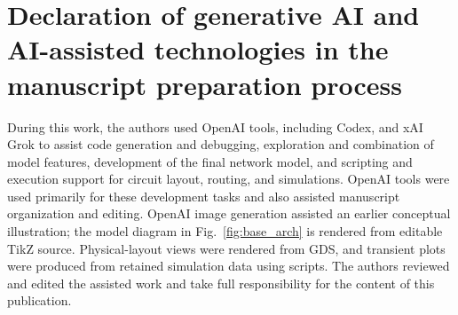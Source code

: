 \documentclass[preprint,12pt,number]{elsarticle}
\begin{document}
\section*{Declaration of generative AI and AI-assisted technologies in the manuscript preparation process}
During this work, the authors used OpenAI tools, including Codex, and xAI Grok to assist code generation and debugging, exploration and combination of model features, development of the final network model, and scripting and execution support for circuit layout, routing, and simulations. OpenAI tools were used primarily for these development tasks and also assisted manuscript organization and editing. OpenAI image generation assisted an earlier conceptual illustration; the model diagram in Fig.~\ref{fig:base_arch} is rendered from editable TikZ source. Physical-layout views were rendered from GDS, and transient plots were produced from retained simulation data using scripts. The authors reviewed and edited the assisted work and take full responsibility for the content of this publication.

\end{document}
